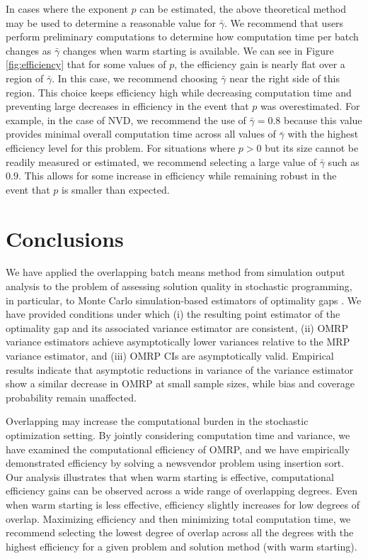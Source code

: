 \documentclass[12pt]{article}
\newcommand{\gammab}{\bar{\gamma}}
\begin{document}
In cases where the exponent $p$ can be estimated, the above theoretical method may be used to determine a reasonable value for $\gammab$.
We recommend that users perform preliminary computations to determine how computation time per batch changes as $\gammab$ changes when warm starting is available. 
We can see in Figure \ref{fig:efficiency} that for some values of $p$, the efficiency gain is nearly flat over a region of $\gammab$.
In this case, we recommend choosing $\gammab$ near the right side of this region.
This choice keeps efficiency high while decreasing computation time and preventing large decreases in efficiency in the event that $p$ was overestimated.
For example, in the case of NVD, we recommend the use of $\gammab=0.8$ 
because this value provides minimal overall computation time across all values of $\gammab$ with the highest efficiency level for this problem.  
For situations where $p > 0$ but its size cannot be readily measured or estimated, we recommend selecting a large value of $\gammab$ such as $0.9$.
This allows for some increase in efficiency while remaining robust in the event that $p$ is smaller than expected.


\section{Conclusions}
\label{sec:concl}

We have applied the overlapping batch means method from simulation output analysis \citep{Meketon1984,Song1992,Welch1987} to the problem of assessing solution quality in stochastic programming, in particular, to Monte Carlo simulation-based estimators of optimality gaps \citep{Mak1999}. 
We have provided conditions under which (i) the resulting point estimator of the optimality gap and its associated variance estimator are consistent, (ii) OMRP variance estimators achieve asymptotically lower variances relative to the MRP variance estimator, and (iii) OMRP CIs are asymptotically valid. 
Empirical results indicate that asymptotic reductions in variance of the variance estimator show a similar decrease in OMRP at small sample sizes, while bias and coverage probability remain unaffected. 

Overlapping may increase the computational burden in the stochastic optimization setting.
By jointly considering computation time and variance, we have examined the computational efficiency of OMRP, and we have empirically demonstrated  efficiency by solving a newsvendor problem using insertion sort.
Our analysis illustrates that when warm starting is effective, computational efficiency gains can be observed across a wide range of overlapping degrees.
Even when warm starting is less effective, efficiency slightly increases for low degrees of overlap. 
Maximizing efficiency and then minimizing total computation time, we recommend  selecting the lowest degree of overlap across all the degrees with the highest efficiency for a given problem and solution method (with warm starting). 
\end{document}
